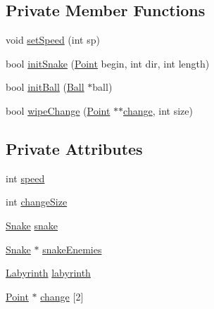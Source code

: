 \subsection*{Private Member Functions}
\begin{DoxyCompactItemize}
\item 
void \mbox{\hyperlink{class_game_a5f3fdd22fa8ae39d6912ee3ff029ea46}{set\+Speed}} (int sp)
\item 
bool \mbox{\hyperlink{class_game_a0e8435182e77e921b5ba0471a8bfb20d}{init\+Snake}} (\mbox{\hyperlink{common_8h_aa9cfdb80b4ca12013a2de8a3b9b97981}{Point}} begin, int dir, int length)
\item 
bool \mbox{\hyperlink{class_game_a3702238c3fef205d19d1cb4bbc471c5c}{init\+Ball}} (\mbox{\hyperlink{class_ball}{Ball}} $\ast$ball)
\item 
bool \mbox{\hyperlink{class_game_aa73688f1ba069a3f1989884099c58449}{wipe\+Change}} (\mbox{\hyperlink{common_8h_aa9cfdb80b4ca12013a2de8a3b9b97981}{Point}} $\ast$$\ast$\mbox{\hyperlink{class_game_a87f9c54e60a724de2644769cd917dbce}{change}}, int size)
\end{DoxyCompactItemize}
\subsection*{Private Attributes}
\begin{DoxyCompactItemize}
\item 
int \mbox{\hyperlink{class_game_a02a58acc040d6d014e02832453695ef5}{speed}}
\item 
int \mbox{\hyperlink{class_game_ae959d08e508fcef98dd07a2b9cd82e65}{change\+Size}}
\item 
\mbox{\hyperlink{class_snake}{Snake}} \mbox{\hyperlink{class_game_ab77bfcc312425811000819791ea7668e}{snake}}
\item 
\mbox{\hyperlink{class_snake}{Snake}} $\ast$ \mbox{\hyperlink{class_game_ab7d2baa4a2dbcb64fc1611aac709fe40}{snake\+Enemies}}
\item 
\mbox{\hyperlink{class_labyrinth}{Labyrinth}} \mbox{\hyperlink{class_game_a92148f2659c019b331e9da7deadbd8bc}{labyrinth}}
\item 
\mbox{\hyperlink{common_8h_aa9cfdb80b4ca12013a2de8a3b9b97981}{Point}} $\ast$ \mbox{\hyperlink{class_game_a87f9c54e60a724de2644769cd917dbce}{change}} \mbox{[}2\mbox{]}
\end{DoxyCompactItemize}


